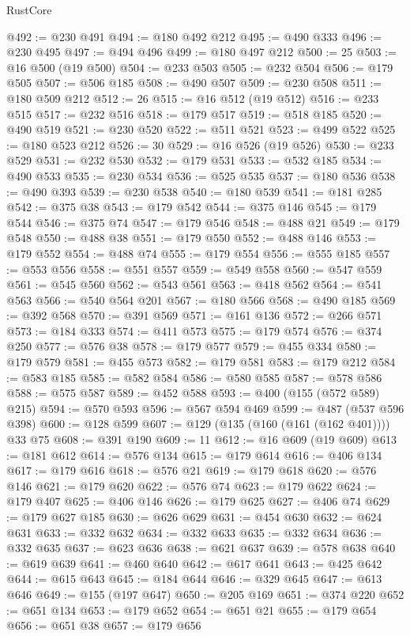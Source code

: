 \begin{lexlean}{RustCore}
\begin{coremodule}
@492 := @230 @491
@494 := @180 @492 @212
@495 := @490 @333
@496 := @230 @495
@497 := @494 @496
@499 := @180 @497 @212
@500 := 25
@503 := @16 @500 (@19 @500)
@504 := @233 @503
@505 := @232 @504
@506 := @179 @505
@507 := @506 @185
@508 := @490 @507
@509 := @230 @508
@511 := @180 @509 @212
@512 := 26
@515 := @16 @512 (@19 @512)
@516 := @233 @515
@517 := @232 @516
@518 := @179 @517
@519 := @518 @185
@520 := @490 @519
@521 := @230 @520
@522 := @511 @521
@523 := @499 @522
@525 := @180 @523 @212
@526 := 30
@529 := @16 @526 (@19 @526)
@530 := @233 @529
@531 := @232 @530
@532 := @179 @531
@533 := @532 @185
@534 := @490 @533
@535 := @230 @534
@536 := @525 @535
@537 := @180 @536
@538 := @490 @393
@539 := @230 @538
@540 := @180 @539
@541 := @181 @285
@542 := @375 @38
@543 := @179 @542
@544 := @375 @146
@545 := @179 @544
@546 := @375 @74
@547 := @179 @546
@548 := @488 @21
@549 := @179 @548
@550 := @488 @38
@551 := @179 @550
@552 := @488 @146
@553 := @179 @552
@554 := @488 @74
@555 := @179 @554
@556 := @555 @185
@557 := @553 @556
@558 := @551 @557
@559 := @549 @558
@560 := @547 @559
@561 := @545 @560
@562 := @543 @561
@563 := @418 @562
@564 := @541 @563
@566 := @540 @564 @201
@567 := @180 @566
@568 := @490 @185
@569 := @392 @568
@570 := @391 @569
@571 := @161 @136
@572 := @266 @571
@573 := @184 @333
@574 := @411 @573
@575 := @179 @574
@576 := @374 @250
@577 := @576 @38
@578 := @179 @577
@579 := @455 @334
@580 := @179 @579
@581 := @455 @573
@582 := @179 @581
@583 := @179 @212
@584 := @583 @185
@585 := @582 @584
@586 := @580 @585
@587 := @578 @586
@588 := @575 @587
@589 := @452 @588
@593 := @400 (@155 (@572 @589) @215)
@594 := @570 @593
@596 := @567 @594 @469
@599 := @487 (@537 @596 @398)
@600 := @128 @599
@607 := @129 (@135 (@160 (@161 (@162 @401)))) @33 @75
@608 := @391 @190
@609 := 11
@612 := @16 @609 (@19 @609)
@613 := @181 @612
@614 := @576 @134
@615 := @179 @614
@616 := @406 @134
@617 := @179 @616
@618 := @576 @21
@619 := @179 @618
@620 := @576 @146
@621 := @179 @620
@622 := @576 @74
@623 := @179 @622
@624 := @179 @407
@625 := @406 @146
@626 := @179 @625
@627 := @406 @74
@629 := @179 @627 @185
@630 := @626 @629
@631 := @454 @630
@632 := @624 @631
@633 := @332 @632
@634 := @332 @633
@635 := @332 @634
@636 := @332 @635
@637 := @623 @636
@638 := @621 @637
@639 := @578 @638
@640 := @619 @639
@641 := @460 @640
@642 := @617 @641
@643 := @425 @642
@644 := @615 @643
@645 := @184 @644
@646 := @329 @645
@647 := @613 @646
@649 := @155 (@197 @647)
@650 := @205 @169
@651 := @374 @220
@652 := @651 @134
@653 := @179 @652
@654 := @651 @21
@655 := @179 @654
@656 := @651 @38
@657 := @179 @656

\end{coremodule}
\end{lexlean}
